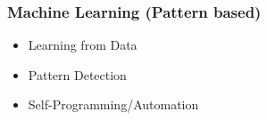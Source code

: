 \begin{frame}[fragile]\frametitle{Machine Learning (Pattern based)}
\begin{itemize}
\item Learning from Data
\item Pattern Detection
\item Self-Programming/Automation
\end{itemize}
\end{frame}

%
%
%
%
%
%
%

